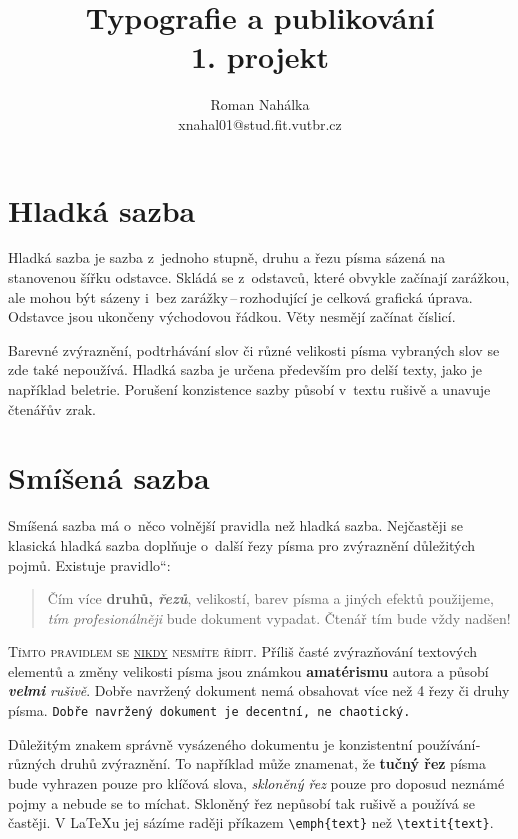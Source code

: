 \documentclass[a4paper, 11pt, twocolumn]{article}
\title{Typografie a publikování \\
	   1. projekt}
\author{Roman Nahálka \\xnahal01@stud.fit.vutbr.cz}
\date{}
\providecommand{\uv} [1] {\quotedblbase #1\textquotedblleft}
\begin{document}
\maketitle
\section{Hladká sazba}
Hladká sazba je sazba z~jednoho stupně, druhu a řezu pí­sma sázená na stanovenou šířku odstavce. Skládá se z~odstavců, které obvykle začínají­ zarážkou, ale mohou být sázeny i~bez zarážky\,--\,rozhodují­cí­ je celková grafická úprava. Odstavce jsou ukončeny východovou řádkou. Věty nesmějí začínat číslicí.

Barevné zvýraznění­, podtrhávání­ slov či různé velikosti písma vybraných slov se zde také nepoužívá. Hladká sazba je určena především pro delší­ texty, jako je napří­klad beletrie. Porušení­ konzistence sazby působí v~textu rušivě a unavuje čtenářův zrak.
	
\section{Smíšená sazba}	
Smíšená sazba má o~něco volnější­ pravidla než hladká sazba. Nejčastěji se klasická hladká sazba doplňuje o~další řezy pí­sma pro zvýraznění­ důležitých pojmů. Existuje \uv{pravidlo}:
\begin{quotation}

Čí­m ví­ce \textbf{druhů, \emph{řezů}}, {\scriptsize velikostí}, barev pí­sma a jiných efektů použijeme, \emph{tí­m profesionálněji} bude  dokument vypadat. Čtenář tím bude vždy {\Huge nadšen!}

\end{quotation}

\textsc{Tí­mto pravidlem se \underline{nikdy} nesmí­te ří­dit.} Příliš časté zvýrazňování textových elementů  a změny velikosti {\tiny pí­sma} jsou {\LARGE známkou} \textbf{{\huge amatérismu}} autora a působí­ \textbf{\emph{velmi}} \emph{rušivě}. Dobře navržený dokument nemá obsahovat ví­ce než 4 řezy či druhy pí­sma. \texttt{Dobře navržený dokument je decentní­, ne chaotický.}

Důležitým znakem správně vysázeného dokumentu je konzistentní použí­vání­ různých druhů zvýraznění­. To napří­klad může znamenat, že \textbf{tučný řez} pí­sma bude vyhrazen pouze pro klíčová slova, \emph{skloněný řez} pouze pro doposud neznámé pojmy a nebude se to míchat. Skloněný řez nepůsobí­ tak rušivě a použí­vá se častěji. V \LaTeX u jej sází­me raději pří­kazem \verb|\emph{text}| než \verb|\textit{text}|.
\end{document}
